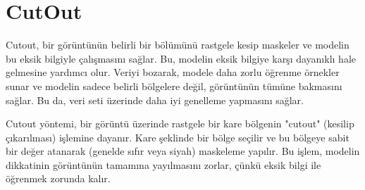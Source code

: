 \section{CutOut}

Cutout, bir görüntünün belirli bir bölümünü rastgele kesip maskeler ve modelin bu eksik bilgiyle çalışmasını sağlar. Bu, modelin eksik bilgiye karşı dayanıklı hale gelmesine yardımcı olur. Veriyi bozarak, modele daha zorlu öğrenme örnekler sunar ve modelin sadece belirli bölgelere değil, görüntünün tümüne bakmasını sağlar. Bu da, veri seti üzerinde daha iyi genelleme yapmasını sağlar.

Cutout yöntemi, bir görüntü üzerinde rastgele bir kare bölgenin "cutout" (kesilip çıkarılması) işlemine dayanır. Kare şeklinde bir bölge seçilir ve bu bölgeye sabit bir değer atanarak (genelde sıfır veya siyah) maskeleme yapılır. Bu işlem, modelin dikkatinin görüntünün tamamına yayılmasını zorlar, çünkü eksik bilgi ile öğrenmek zorunda kalır.

\newpage